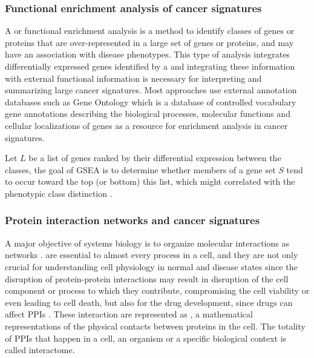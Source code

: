 \subsubsection{Functional enrichment analysis of cancer signatures}

A  or  functional enrichment analysis is a method to identify classes of genes or proteins that are over-represented in a large set of genes or proteins, and may have an association with disease phenotypes.
This type of analysis integrates  differentially expressed genes identified by a   and integrating these information with external functional information is necessary for interpreting and summarizing large cancer signatures.
Most approaches use external annotation databases such as Gene Ontology which is a database of controlled vocabulary gene annotations describing the biological processes, molecular functions and cellular localizations of genes as a resource for enrichment analysis in cancer signatures.

Let $L$ be a  list of genes ranked by their differential expression between the classes, the goal of GSEA is to determine whether members of a gene set $S$ tend to occur toward the top (or bottom) this list,  which might correlated with the phenotypic class
distinction \cite{subramanian2005gene}.

\subsubsection{Protein interaction networks and cancer signatures}

A major objective of systems biology is to organize molecular interactions as networks \cite{vinayagam2014integrating}.  are essential to almost every process in a cell, and they are not only crucial for understanding cell physiology in normal and disease states since the disruption of protein-protein interactions may result in disruption of the cell component or process to which they contribute, compromising the cell viability or even leading to cell death, but also for the drug development, since drugs can affect PPIs \cite{PPIs,alzate2009neuroproteomics}.
These interaction are represented as , a mathematical representations of the physical contacts between proteins in the cell.
The totality of PPIs that happen in a cell, an organism or a specific biological context is called interactome.

